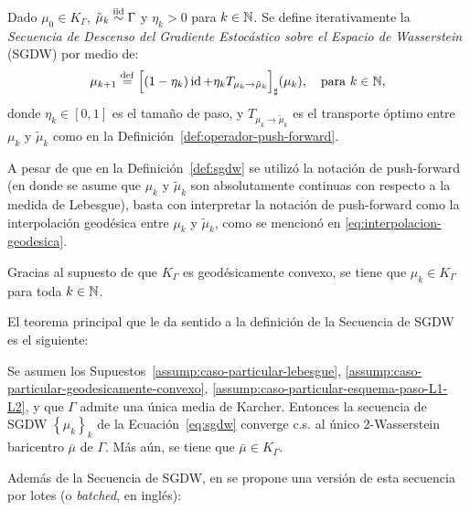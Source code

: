 \begin{definition}\label{def:sgdw}
	Dado $\mu_0 \in K_\Gamma$, $\tilde \mu_k \stackrel{\mathrm{iid}}{\sim} \Gamma$ y $\eta_k > 0$ para $k \in\mathbb{N}$. Se define iterativamente la \textit{Secuencia de Descenso del Gradiente Estocástico sobre el Espacio de Wasserstein} (SGDW) por medio de:
	\begin{equation}
		\label{eq:sgdw}
		\mu_{k+1} \stackrel{\mathrm{def}}{=} {\qty\Big[
				(1 - \eta_k) \operatorname{id} + \eta_k T_{\mu_k \to \tilde \mu_k}
			]}_{\sharp} (\mu_k), \quad \text{para } k \in\mathbb{N},
	\end{equation}
	donde $\eta_k \in [0, 1]$ es el tamaño de paso, y $T_{\mu_k \to \tilde \mu_k}$ es el transporte óptimo entre $\mu_k$ y $\tilde \mu_k$ como en la Definición~\ref{def:operador-push-forward}.
\end{definition}


\begin{remark}
	A pesar de que en la Definición~\ref{def:sgdw} se utilizó la notación de push-forward (en donde se asume que $\mu_k$ y $\tilde \mu_k$ son absolutamente continuas con respecto a la medida de Lebesgue), basta con interpretar la notación de push-forward como la interpolación geodésica entre $\mu_k$ y $\tilde \mu_k$, como se mencionó en \eqref{eq:interpolacion-geodesica}.
\end{remark}

\begin{remark}
	Gracias al supuesto de que $K_\Gamma$ es geodésicamente convexo, se tiene que $\mu_k \in K_\Gamma$ para toda $k \in\mathbb{N}$.
\end{remark}

El teorema principal que le da sentido a la definición de la Secuencia de SGDW es el siguiente:

\begin{theorem}\label{thm:convergencia-sgdw}
	Se asumen los Supuestos~\ref{assump:caso-particular-lebesgue}, \ref{assump:caso-particular-geodesicamente-convexo}, \ref{assump:caso-particular-esquema-paso-L1-L2}, y que $\Gamma$ admite una única media de Karcher. Entonces la secuencia de SGDW $\left\{ \mu_k \right\}_k$ de la Ecuación~\eqref{eq:sgdw} converge c.s. al único 2-Wasserstein baricentro $\bar \mu$ de $\Gamma$. Más aún, se tiene que $\bar \mu\in K_\Gamma$.
\end{theorem}

Además de la Secuencia de SGDW, en \cite{backhoff2022stochastic} se propone una versión de esta secuencia por lotes (o \textit{batched}, en inglés):

